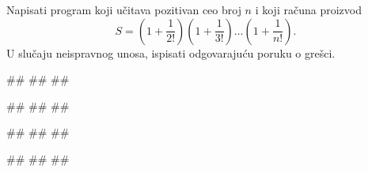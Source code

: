 \begin{Exercise}[difficulty=1, label=PET_47] 
Napisati program koji učitava pozitivan ceo broj $n$ i
koji računa proizvod
$$S = (1 + \frac{1}{2!})(1 + \frac{1}{3!})\ldots(1 +
\frac{1}{n!}).$$ 
U slučaju neispravnog unosa, ispisati odgovarajuću poruku o grešci.
  
\begin{miditest}
\begin{upotreba}{1}
#\naslovInt#
##
##
\end{upotreba}
\end{miditest}
\begin{miditest}
\begin{upotreba}{2}
#\naslovInt#
##
##
\end{upotreba}
\end{miditest}

\begin{miditest}
\begin{upotreba}{3}
#\naslovInt#
##
##
\end{upotreba}
\end{miditest}
\begin{miditest}
\begin{upotreba}{4}
#\naslovInt#
##
##
\end{upotreba}
\end{miditest}
\end{Exercise}
\ifresenja
\begin{Answer}[ref=PET_47]
\end{Answer}
\fi


